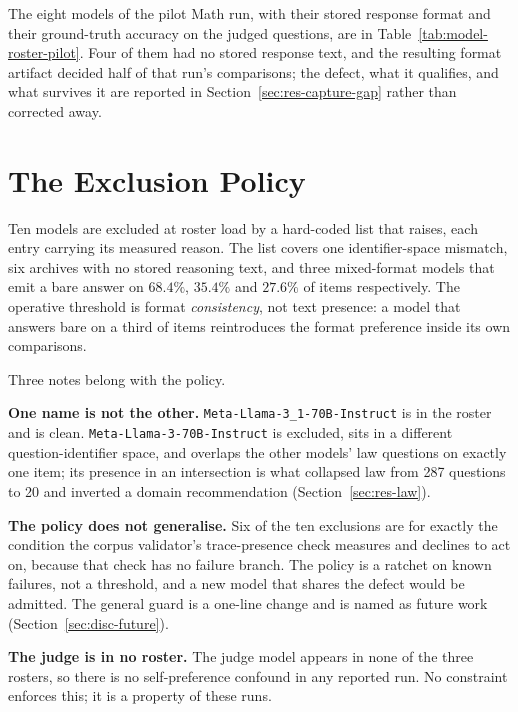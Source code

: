 The eight models of the pilot Math run, with their stored response
format and their ground-truth accuracy on the judged questions, are in
Table~\ref{tab:model-roster-pilot}. Four of them had no stored response
text, and the resulting format artifact decided half of that run's
comparisons; the defect, what it qualifies, and what survives it are
reported in Section~\ref{sec:res-capture-gap} rather than corrected
away.

\section{The Exclusion Policy}

Ten models are excluded at roster load by a hard-coded list that
raises, each entry carrying its measured reason. The list covers one
identifier-space mismatch, six archives with no stored reasoning text,
and three mixed-format models that emit a bare answer on $68.4\%$,
$35.4\%$ and $27.6\%$ of items respectively. The operative threshold is
format \emph{consistency}, not text presence: a model that answers
bare on a third of items reintroduces the format preference inside its
own comparisons.

Three notes belong with the policy.

\textbf{One name is not the other.} \texttt{Meta-Llama-3\_1-70B-Instruct}
is in the roster and is clean. \texttt{Meta-Llama-3-70B-Instruct} is
excluded, sits in a different question-identifier space, and overlaps
the other models' law questions on exactly one item; its presence in an
intersection is what collapsed law from 287 questions to 20 and
inverted a domain recommendation (Section~\ref{sec:res-law}).

\textbf{The policy does not generalise.} Six of the ten exclusions are
for exactly the condition the corpus validator's trace-presence check
measures and declines to act on, because that check has no failure
branch. The policy is a ratchet on known failures, not a threshold, and
a new model that shares the defect would be admitted. The general guard
is a one-line change and is named as future work
(Section~\ref{sec:disc-future}).

\textbf{The judge is in no roster.} The judge model appears in none of
the three rosters, so there is no self-preference confound in any
reported run. No constraint enforces this; it is a property of these
runs.

